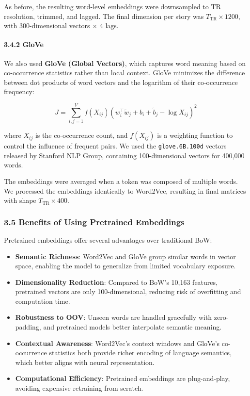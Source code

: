 \documentclass[11pt]{article}
\begin{document}
As before, the resulting word-level embeddings were downsampled to TR
resolution, trimmed, and lagged. The final dimension per story was
\(T_{\text{TR}} \times 1200\), with 300-dimensional vectors × 4 lags.

\hypertarget{glove}{%
\paragraph{3.4.2 GloVe}\label{glove}}

We also used \textbf{GloVe (Global Vectors)}, which captures word
meaning based on co-occurrence statistics rather than local context.
GloVe minimizes the difference between dot products of word vectors and
the logarithm of their co-occurrence frequency:

\[
J = \sum_{i,j=1}^{V} f(X_{ij}) \left( w_i^\top \tilde{w}_j + b_i + \tilde{b}_j - \log X_{ij} \right)^2
\]

where \(X_{ij}\) is the co-occurrence count, and \(f(X_{ij})\) is a
weighting function to control the influence of frequent pairs. We used
the \texttt{glove.6B.100d} vectors released by Stanford NLP Group,
containing 100-dimensional vectors for 400,000 words.

The embeddings were averaged when a token was composed of multiple
words. We processed the embeddings identically to Word2Vec, resulting in
final matrices with shape \(T_{\text{TR}} \times 400\).

\hypertarget{benefits-of-using-pretrained-embeddings}{%
\subsubsection{3.5 Benefits of Using Pretrained
Embeddings}\label{benefits-of-using-pretrained-embeddings}}

Pretrained embeddings offer several advantages over traditional BoW:

\begin{itemize}
\item
  \textbf{Semantic Richness}: Word2Vec and GloVe group similar words in
  vector space, enabling the model to generalize from limited vocabulary
  exposure.
\item
  \textbf{Dimensionality Reduction}: Compared to BoW's 10,163 features,
  pretrained vectors are only 100-dimensional, reducing risk of
  overfitting and computation time.
\item
  \textbf{Robustness to OOV}: Unseen words are handled gracefully with
  zero-padding, and pretrained models better interpolate semantic
  meaning.
\item
  \textbf{Contextual Awareness}: Word2Vec's context windows and GloVe's
  co-occurrence statistics both provide richer encoding of language
  semantics, which better aligns with neural representation.
\item
  \textbf{Computational Efficiency}: Pretrained embeddings are
  plug-and-play, avoiding expensive retraining from scratch.
\end{itemize}
\end{document}
